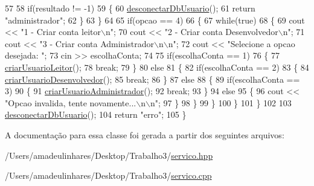 \begin{DoxyCode}
57 
58     \textcolor{keywordflow}{if}(resultado != -1)
59     \{
60       \mbox{\hyperlink{comando_sql_8cpp_a969be9911913568e30d4ae8963338bc3}{desconectarDbUsuario}}();
61       \textcolor{keywordflow}{return} \textcolor{stringliteral}{"administrador"};
62     \}
63   \}
64 
65   \textcolor{keywordflow}{if}(opcao == 4)
66   \{
67     \textcolor{keywordflow}{while}(\textcolor{keyword}{true})
68     \{
69       cout << \textcolor{stringliteral}{"1 - Criar conta leitor\(\backslash\)n"};
70       cout << \textcolor{stringliteral}{"2 - Criar conta Desenvolvedor\(\backslash\)n"};
71       cout << \textcolor{stringliteral}{"3 - Criar conta Administrador\(\backslash\)n\(\backslash\)n"};
72       cout << \textcolor{stringliteral}{"Selecione a opcao desejada: "};
73       cin >> escolhaConta;
74 
75       \textcolor{keywordflow}{if}(escolhaConta == 1)
76       \{
77         \mbox{\hyperlink{class_servico_login_ae6786007e98ac8288dc53d025d5f5bcd}{criarUsuarioLeitor}}();
78         \textcolor{keywordflow}{break};
79       \}
80       \textcolor{keywordflow}{else}
81       \{
82         \textcolor{keywordflow}{if}(escolhaConta == 2)
83         \{
84           \mbox{\hyperlink{class_servico_login_aff5fc69ce9c3fa82c6c575f025ac2a34}{criarUsuarioDesenvolvedor}}();
85           \textcolor{keywordflow}{break};
86         \}
87         \textcolor{keywordflow}{else}
88         \{
89           \textcolor{keywordflow}{if}(escolhaConta == 3)
90           \{
91             \mbox{\hyperlink{class_servico_login_a2f7e5d945f4ce6b06c8ce093ed3755e7}{criarUsuarioAdministrador}}();
92             \textcolor{keywordflow}{break};
93           \}
94           \textcolor{keywordflow}{else}
95           \{
96             cout << \textcolor{stringliteral}{"Opcao invalida, tente novamente...\(\backslash\)n\(\backslash\)n"};
97           \}
98         \}
99       \}
100     \}
101   \}
102 
103   \mbox{\hyperlink{comando_sql_8cpp_a969be9911913568e30d4ae8963338bc3}{desconectarDbUsuario}}();
104   \textcolor{keywordflow}{return} \textcolor{stringliteral}{"erro"};
105 \}
\end{DoxyCode}


A documentação para essa classe foi gerada a partir dos seguintes arquivos\+:\begin{DoxyCompactItemize}
\item 
/\+Users/amadeulinhares/\+Desktop/\+Trabalho3/\mbox{\hyperlink{servico_8hpp}{servico.\+hpp}}\item 
/\+Users/amadeulinhares/\+Desktop/\+Trabalho3/\mbox{\hyperlink{servico_8cpp}{servico.\+cpp}}\end{DoxyCompactItemize}
